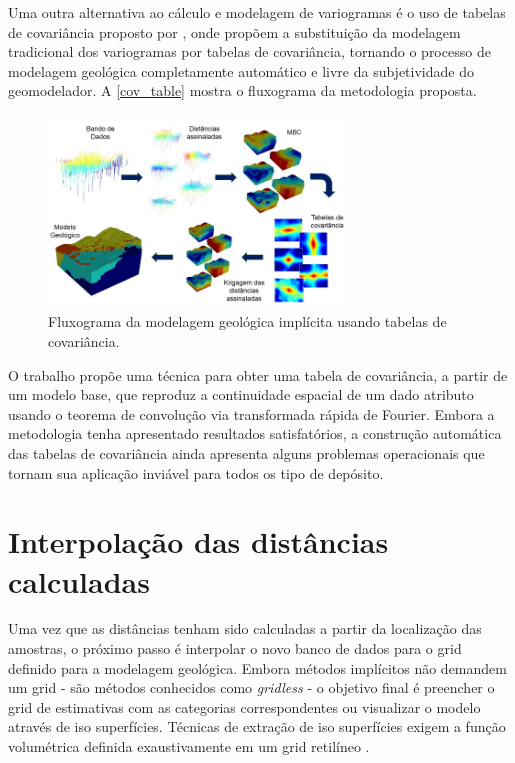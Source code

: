 Uma outra alternativa ao cálculo e modelagem de variogramas é o uso de tabelas de covariância proposto por , onde propõem a substituição da modelagem tradicional dos variogramas por tabelas de covariância, tornando o processo de modelagem geológica completamente automático e livre da subjetividade do geomodelador. A \autoref{cov_table} mostra o fluxograma da metodologia proposta.

\begin{figure}[H]
	\caption{\label{cov_table}Fluxograma da modelagem geológica implícita usando tabelas de covariância.}
	\begin{center}
		\includegraphics[width=0.7\textwidth]{capitulo_2/cov_table.png}
	\end{center}
\end{figure}

O trabalho propõe uma técnica para obter uma tabela de covariância, a partir de um modelo base, que reproduz a continuidade espacial de um dado atributo usando o teorema de convolução via transformada rápida de Fourier. Embora a metodologia tenha apresentado resultados satisfatórios, a construção automática das tabelas de covariância ainda apresenta alguns problemas operacionais que tornam sua aplicação inviável para todos os tipo de depósito.

\section{Interpolação das distâncias calculadas}

Uma vez que as distâncias tenham sido calculadas a partir da localização das amostras, o próximo passo é interpolar o novo banco de dados para o grid definido para a modelagem geológica. Embora métodos implícitos não demandem um grid - são métodos conhecidos como \textit{gridless} - o objetivo final é preencher o grid de estimativas com as categorias correspondentes ou visualizar o modelo através de iso superfícies. Técnicas de extração de iso superfícies exigem a função volumétrica definida exaustivamente em um grid retilíneo \cite{martin2017implicitmodeling}.

